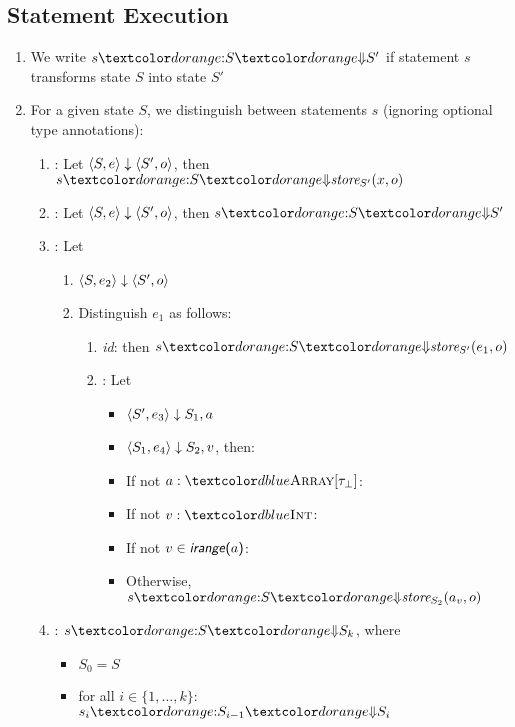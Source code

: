 \subsection{Statement Execution}
\begin{enumerate}
\item We write $\SEVAL{s}{S}{S'}$ if statement $s$ transforms state $S$ into state $S'$
\item For a given state $S$, we distinguish between statements $s$ (ignoring optional type annotations):
  \begin{enumerate}
    \item {}: Let $\langle S, e \rangle \downarrow \langle S', o \rangle$, then $\SEVAL{s}{S}{\textit{store}_{S'}(x, o)}$
    \item {}: Let $\langle S, e \rangle \downarrow \langle S', o \rangle$, then $\SEVAL{s}{S}{S'}$
    \item {}: Let
      \begin{enumerate}
      \item $\langle S, e_2 \rangle \downarrow \langle S', o \rangle$
      \item Distinguish $e_1$ as follows:
        \begin{enumerate}
          \item \textit{id}: then $\SEVAL{s}{S}{\textit{store}_{S'}(e_1, o)}$
          \item {}: Let
            \begin{itemize}
            \item $\langle S', e_3 \rangle \downarrow {S_1, a}$
            \item $\langle S_1, e_4 \rangle \downarrow {S_2, v}$, then:
            \item If not $a : \TArrayof{\tau_\bot}$: \failure
            \item If not $v : \TInt$: \failure
            \item If not $v \in \textsf{\textit{irange}($a$)}$: \failure
            \item Otherwise, $\SEVAL{s}{S}{\textit{store}_{S_2}(a_v, o)}$
            \end{itemize}
        \end{enumerate}
      \end{enumerate}
    \item {}: $\SEVAL{s}{S}{S_k}$, where
      \begin{itemize}
        \item $S_0 = S$
        \item for all $i \in \{1, \ldots, k\}$: $\SEVAL{s_i}{S_{i-1}}{S_i}$

\end{itemize}
\end{enumerate}
\end{enumerate}
